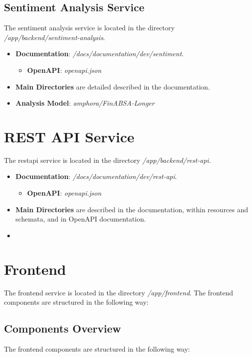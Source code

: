 \subsection{Sentiment Analysis Service}
\label{subsec:development-sentiment}
The sentiment analysis service is located in the directory \textit{/app/backend/sentiment-analysis}.

\begin{itemize}
    \item \textbf{Documentation}: \textit{/docs/documentation/dev/sentiment}.
    \begin{itemize}
        \item \textbf{OpenAPI}: \textit{openapi.json}
    \end{itemize}
    \item \textbf{Main Directories} are detailed described in the documentation.
    \item \textbf{Analysis Model}: \textit{amphora/FinABSA-Longer}
\end{itemize}

\section{REST API Service}
\label{sec:development-rest-api}
The \acrshort{restapi} service is located in the directory \textit{/app/backend/rest-api}.

\begin{itemize}
    \item \textbf{Documentation}: \textit{/docs/documentation/dev/rest-api}.
    \begin{itemize}
        \item \textbf{OpenAPI}: \textit{openapi.json}
    \end{itemize}
    \item \textbf{Main Directories} are described in the documentation, within resources and schemata, and in OpenAPI documentation.
    \item \
\end{itemize}

\section{Frontend}
\label{sec:development-frontend}
The frontend service is located in the directory \textit{/app/frontend}. The frontend components are structured in the following way:

\subsection{Components Overview}
\label{subsec:development-components-overview}
The frontend components are structured in the following way:

